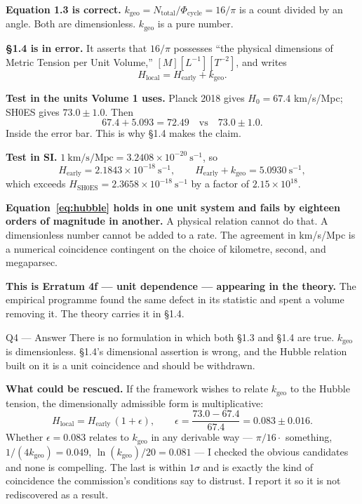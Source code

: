 \documentclass[11pt,letterpaper]{article}
\newcommand{\kgeo}{k_{\mathrm{geo}}}
\begin{document}
\begin{derivbox}
\textbf{Equation 1.3 is correct.} $\kgeo = N_{\mathrm{total}}/\Phi_{\mathrm{cycle}} = 16/\pi$
is a count divided by an angle. Both are dimensionless. $\kgeo$ is a pure number.

\medskip
\textbf{\S1.4 is in error.} It asserts that $16/\pi$ possesses ``the physical dimensions of
Metric Tension per Unit Volume,'' $[M][L^{-1}][T^{-2}]$, and writes
\begin{equation}
H_{\mathrm{local}} = H_{\mathrm{early}} + \kgeo .
\label{eq:hubble}
\end{equation}

\medskip
\textbf{Test in the units Volume 1 uses.} Planck 2018 gives $H_0 = 67.4$ km/s/Mpc; SH0ES
gives $73.0 \pm 1.0$. Then
\[
67.4 + 5.093 = 72.49 \quad\text{vs}\quad 73.0 \pm 1.0 .
\]
Inside the error bar. This is why \S1.4 makes the claim.

\medskip
\textbf{Test in SI.} $1~\mathrm{km/s/Mpc} = 3.2408\times10^{-20}~\mathrm{s^{-1}}$, so
\[
H_{\mathrm{early}} = 2.1843\times10^{-18}~\mathrm{s^{-1}}, \qquad
H_{\mathrm{early}} + \kgeo = 5.0930~\mathrm{s^{-1}},
\]
which exceeds $H_{\mathrm{SH0ES}} = 2.3658\times10^{-18}~\mathrm{s^{-1}}$ by a factor of
$2.15\times10^{18}$.
\end{derivbox}

\begin{negbox}
\textbf{Equation~\eqref{eq:hubble} holds in one unit system and fails by eighteen orders of
magnitude in another.} A physical relation cannot do that. A dimensionless number cannot be
added to a rate. The agreement in km/s/Mpc is a numerical coincidence contingent on the
choice of kilometre, second, and megaparsec.

\medskip
\textbf{This is Erratum 4f --- unit dependence --- appearing in the theory.} The empirical
programme found the same defect in its statistic and spent a volume removing it. The theory
carries it in \S1.4.
\end{negbox}

\begin{answerbox}{Q4 --- Answer}
There is no formulation in which both \S1.3 and \S1.4 are true. $\kgeo$ is dimensionless.
\S1.4's dimensional assertion is wrong, and the Hubble relation built on it is a unit
coincidence and should be withdrawn.

\medskip
\textbf{What could be rescued.} If the framework wishes to relate $\kgeo$ to the Hubble
tension, the dimensionally admissible form is multiplicative:
\[
H_{\mathrm{local}} = H_{\mathrm{early}}\,(1 + \epsilon), \qquad
\epsilon = \frac{73.0 - 67.4}{67.4} = 0.083 \pm 0.016 .
\]
Whether $\epsilon = 0.083$ relates to $\kgeo$ in any derivable way --- $\pi/16 \cdot$
something, $1/(4\kgeo) = 0.049$, $\ln(\kgeo)/20 = 0.081$ --- I checked the obvious
candidates and none is compelling. The last is within $1\sigma$ and is exactly the kind of
coincidence the commission's conditions say to distrust. I report it so it is not
rediscovered as a result.
\end{answerbox}
\end{document}
